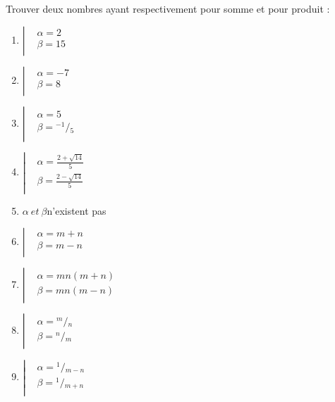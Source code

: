 \begin{solution}
Trouver deux nombres ayant respectivement pour somme et pour produit :
\begin{multicols}{2}
\begin{enumerate}
\item $\left| \begin{array}{ll}
&\alpha =2\\
 & \beta =15 \\ 
\end{array} \right.$
\item $\left| \begin{array}{ll}
  & \alpha =-7 \\ 
 & \beta =8 \\ 
\end{array} \right.$
\item $\left| \begin{array}{ll}
  & \alpha =5 \\ 
 & \beta ={}^{-1}/{}_{5} \\ 
\end{array} \right.$
\item $\left| \begin{array}{ll}
  & \alpha =\frac{2+\sqrt{14}}{5} \\ 
 & \beta =\frac{2-\sqrt{14}}{5} \\ 
\end{array} \right.$
\item  $\alpha \ et\ \beta $n'existent pas
\item $\left| \begin{array}{ll}
  & \alpha =m+n \\ 
 & \beta =m-n \\ 
\end{array} \right.$
\item $\left| \begin{array}{ll}
  & \alpha =mn\left( m+n \right) \\ 
 & \beta =mn\left( m-n \right) \\ 
\end{array} \right.$
\item $\left| \begin{array}{ll}
  & \alpha ={}^{m}/{}_{n} \\ 
 & \beta ={}^{n}/{}_{m} \\ 
\end{array} \right.$
\item $\left| \begin{array}{ll}
  & \alpha ={}^{1}/{}_{m-n} \\ 
 & \beta ={}^{1}/{}_{m+n} \\ 
\end{array} \right.$
\end{enumerate}
\end{multicols}
\end{solution}

